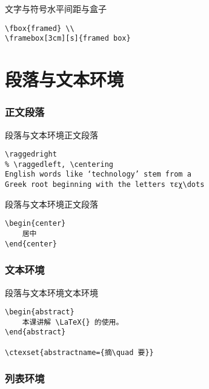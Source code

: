 \documentclass[11pt]{beamer}
\begin{document}
\begin{frame}[fragile]{文字与符号}{水平间距与盒子}
\begin{Verbatim}[tabsize=2]
\fbox{framed} \\
\framebox[3cm][s]{framed box}
\end{Verbatim}
\end{frame}

\part{段落与文本环境}

\section{正文段落}

\begin{frame}[fragile]{段落与文本环境}{正文段落}
\begin{Verbatim}[tabsize=2]
\raggedright
% \raggedleft, \centering
English words like ‘technology’ stem from a
Greek root beginning with the letters τεχ\dots
\end{Verbatim}
\end{frame}

\begin{frame}[fragile]{段落与文本环境}{正文段落}
\begin{Verbatim}[tabsize=2]
\begin{center}
	居中
\end{center}
\end{Verbatim}
\end{frame}

\section{文本环境}

\begin{frame}[fragile]{段落与文本环境}{文本环境}
\begin{Verbatim}[tabsize=2]
\begin{abstract}
	本课讲解 \LaTeX{} 的使用。
\end{abstract}

\ctexset{abstractname={摘\quad 要}}
\end{Verbatim}
\end{frame}

\section{列表环境}
\end{document}
